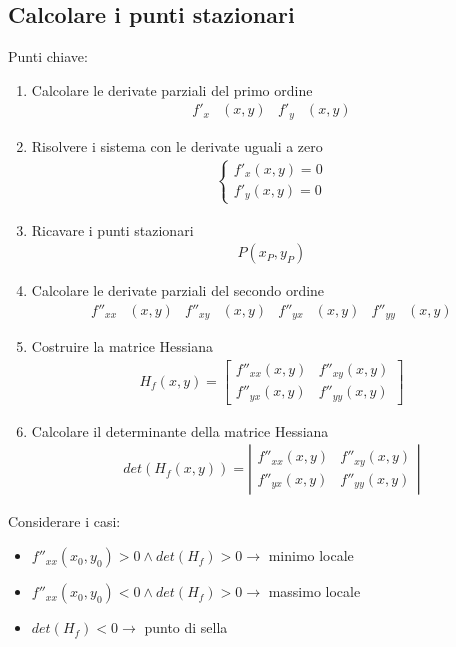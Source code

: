 \documentclass[a4paper]{article}
\begin{document}
	\subsection{Calcolare i punti stazionari}
	Punti chiave:
	\begin{enumerate}
		\item Calcolare le derivate parziali del primo ordine
			\begin{align*}
				f'_x&(x,y)	&	f'_y&(x,y)
			\end{align*}
		\item Risolvere i sistema con le derivate uguali a zero
			\begin{align*}
				\begin{cases}
				f'_x(x,y)=0\\
				f'_y(x,y)=0
				\end{cases}
			\end{align*}
		\item Ricavare i punti stazionari
			\begin{align*}
				P(x_P,y_P)
			\end{align*}
		\item Calcolare le derivate parziali del secondo ordine
			\begin{align*}
				f''_{xx}&(x,y)	&	f''_{xy}&(x,y)	&	f''_{yx}&(x,y)	&	f''_{yy}&(x,y)
			\end{align*}
		\item Costruire la matrice Hessiana
			\begin{align*}
				H_f(x,y) = \left[
				\begin{array}{cc}
				f''_{xx}(x,y) & f''_{xy}(x,y) \\ 
				f''_{yx}(x,y) & f''_{yy}(x,y)
				\end{array} \right]
			\end{align*}
		\item Calcolare il determinante della matrice Hessiana
			\begin{align*}
				det(H_f(x,y)) = \left|
				\begin{array}{cc}
				f''_{xx}(x,y) & f''_{xy}(x,y) \\ 
				f''_{yx}(x,y) & f''_{yy}(x,y)
				\end{array} \right|
				\end{align*}
			\end{enumerate}
		Considerare i casi:\\
			\begin{itemize}
				\item $f''_{xx}(x_0,y_0) > 0 \wedge det(H_f) > 0 \to $ minimo locale
				\item $f''_{xx}(x_0,y_0) < 0 \wedge det(H_f) > 0 \to $ massimo locale
				\item $det(H_f) < 0 \to $ punto di sella
			\end{itemize}
			\newpage
\end{document}
